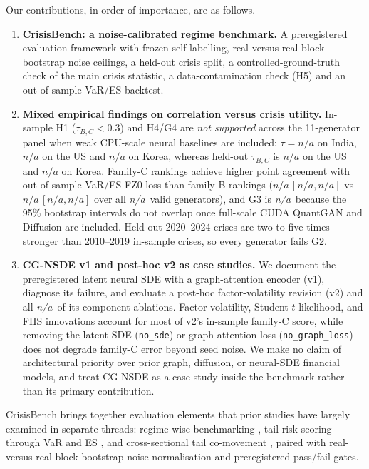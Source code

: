 \documentclass[journal]{IEEEtran}
\newcommand{\pendingnum}{\textit{n/a}}
\providecommand{\nRiskGenerators}{\pendingnum}
\providecommand{\nAblationVariants}{\pendingnum}
\providecommand{\tauBCnseFullPrereg}{\pendingnum}
\providecommand{\tauBCusFullPrereg}{\pendingnum}
\providecommand{\tauBCusHeldPrereg}{\pendingnum}
\providecommand{\tauBCkrFullPrereg}{\pendingnum}
\providecommand{\tauBCkrHeldPrereg}{\pendingnum}
\providecommand{\tauRiskB}{\pendingnum}
\providecommand{\tauRiskBLo}{\pendingnum}
\providecommand{\tauRiskBHi}{\pendingnum}
\providecommand{\tauRiskC}{\pendingnum}
\providecommand{\tauRiskCLo}{\pendingnum}
\providecommand{\tauRiskCHi}{\pendingnum}
\providecommand{\verdictGThree}{\pendingnum}
\begin{document}
Our contributions, in order of importance, are as follows.
\begin{enumerate}
\item \textbf{CrisisBench: a noise-calibrated regime benchmark.} A preregistered evaluation framework with
frozen self-labelling, real-versus-real block-bootstrap noise ceilings, a held-out crisis split, a
controlled-ground-truth check of the main crisis statistic, a data-contamination check (H5) and an
out-of-sample VaR/ES backtest.
\item \textbf{Mixed empirical findings on correlation versus crisis utility.} In-sample H1
($\tau_{B,C}<0.3$) and H4/G4 are \emph{not supported} across the 11-generator panel when weak CPU-scale neural
baselines are included: $\tau = \tauBCnseFullPrereg$ on India, $\tauBCusFullPrereg$ on the US and
$\tauBCkrFullPrereg$ on Korea, whereas held-out $\tau_{B,C}$ is $\tauBCusHeldPrereg$ on the US and
$\tauBCkrHeldPrereg$ on Korea. Family-C rankings achieve higher point agreement with out-of-sample
VaR/ES FZ0 loss than family-B rankings ($\tauRiskC\,[\tauRiskCLo,\tauRiskCHi]$ vs
$\tauRiskB\,[\tauRiskBLo,\tauRiskBHi]$ over all \nRiskGenerators\ valid generators), and G3 is \verdictGThree\
because the 95\% bootstrap intervals do not overlap once full-scale CUDA QuantGAN and Diffusion are included.
Held-out 2020--2024 crises are two to five times stronger than 2010--2019 in-sample crises, so every
generator fails G2.
\item \textbf{CG-NSDE v1 and post-hoc v2 as case studies.} We document the preregistered latent neural SDE
with a graph-attention encoder (v1), diagnose its failure, and evaluate a post-hoc factor-volatility revision
(v2) and all \nAblationVariants\ of its component ablations. Factor volatility, Student-$t$ likelihood,
and FHS innovations account for most of v2's in-sample family-C score, while removing the latent SDE
(\texttt{no\_sde}) or graph attention loss (\texttt{no\_graph\_loss}) does not degrade family-C error beyond
seed noise. We make
no claim of architectural priority over prior graph, diffusion, or neural-SDE financial models, and treat
CG-NSDE as a case study inside the benchmark rather than its primary contribution.
\end{enumerate}

CrisisBench brings together evaluation elements that prior studies have largely examined in separate threads:
regime-wise benchmarking \cite{ang2025ctbench,sun2026finstressts}, tail-risk scoring through VaR and ES
\cite{cont2022tailgan,ericson2024var}, and cross-sectional tail co-movement \cite{huh2026marketgans}, paired
with real-versus-real block-bootstrap noise normalisation and preregistered pass/fail gates.
\end{document}
